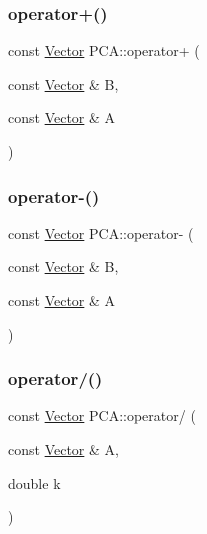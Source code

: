 \hypertarget{namespace_p_c_a_a017b6648f950fd5e297bc92225a425dc}{}\label{namespace_p_c_a_a017b6648f950fd5e297bc92225a425dc} 
\subsubsection{\texorpdfstring{operator+()}{operator+()}}
{\footnotesize\ttfamily const \hyperlink{class_p_c_a_1_1_vector}{Vector} P\+C\+A\+::operator+ (\begin{DoxyParamCaption}\item[{const \hyperlink{class_p_c_a_1_1_vector}{Vector} \&}]{B,  }\item[{const \hyperlink{class_p_c_a_1_1_vector}{Vector} \&}]{A }\end{DoxyParamCaption})\hspace{0.3cm}{\ttfamily [inline]}}

\hypertarget{namespace_p_c_a_a430437e74079b33bcf7a99ef38c01134}{}\label{namespace_p_c_a_a430437e74079b33bcf7a99ef38c01134} 
\subsubsection{\texorpdfstring{operator-\/()}{operator-()}}
{\footnotesize\ttfamily const \hyperlink{class_p_c_a_1_1_vector}{Vector} P\+C\+A\+::operator-\/ (\begin{DoxyParamCaption}\item[{const \hyperlink{class_p_c_a_1_1_vector}{Vector} \&}]{B,  }\item[{const \hyperlink{class_p_c_a_1_1_vector}{Vector} \&}]{A }\end{DoxyParamCaption})\hspace{0.3cm}{\ttfamily [inline]}}

\hypertarget{namespace_p_c_a_a5144cc8f2a3d8ab924e8c4c1c32a2aed}{}\label{namespace_p_c_a_a5144cc8f2a3d8ab924e8c4c1c32a2aed} 
\subsubsection{\texorpdfstring{operator/()}{operator/()}}
{\footnotesize\ttfamily const \hyperlink{class_p_c_a_1_1_vector}{Vector} P\+C\+A\+::operator/ (\begin{DoxyParamCaption}\item[{const \hyperlink{class_p_c_a_1_1_vector}{Vector} \&}]{A,  }\item[{double}]{k }\end{DoxyParamCaption})\hspace{0.3cm}{\ttfamily [inline]}}

